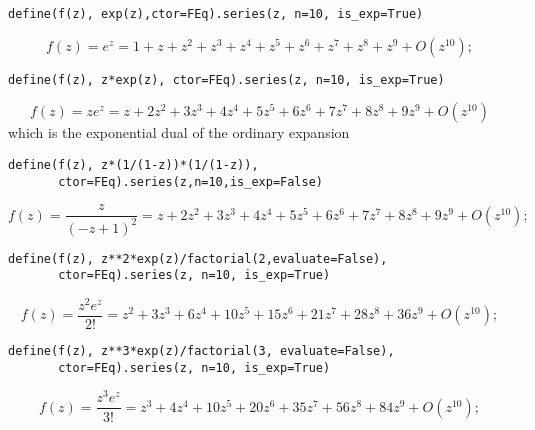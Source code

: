 \begin{verbatim}
define(f(z), exp(z),ctor=FEq).series(z, n=10, is_exp=True)
\end{verbatim}
\begin{displaymath}
f{\left (z \right )} = e^{z} = 1 + z + z^{2} + z^{3} + z^{4} + z^{5} + z^{6} + z^{7} + z^{8} + z^{9} + O\left(z^{10}\right);
\end{displaymath}

\begin{verbatim}
define(f(z), z*exp(z), ctor=FEq).series(z, n=10, is_exp=True)
\end{verbatim}
\begin{displaymath}
f{\left (z \right )} = z e^{z} = z + 2 z^{2} + 3 z^{3} + 4 z^{4} + 5 z^{5} + 6 z^{6} + 7 z^{7} + 8 z^{8} + 9 z^{9} + O\left(z^{10}\right)
\end{displaymath}
which is the exponential dual of the ordinary expansion
\begin{verbatim}
define(f(z), z*(1/(1-z))*(1/(1-z)),
       ctor=FEq).series(z,n=10,is_exp=False)
\end{verbatim}
\begin{displaymath}
f{\left (z \right )} = \frac{z}{\left(- z + 1\right)^{2}} = z + 2 z^{2} + 3 z^{3} + 4 z^{4} + 5 z^{5} + 6 z^{6} + 7 z^{7} + 8 z^{8} + 9 z^{9} + O\left(z^{10}\right);
\end{displaymath}

\begin{verbatim}
define(f(z), z**2*exp(z)/factorial(2,evaluate=False),
       ctor=FEq).series(z, n=10, is_exp=True)
\end{verbatim}
\begin{displaymath}
f{\left (z \right )} = \frac{z^{2} e^{z}}{2!} = z^{2} + 3 z^{3} + 6 z^{4} + 10 z^{5} + 15 z^{6} + 21 z^{7} + 28 z^{8} + 36 z^{9} + O\left(z^{10}\right);
\end{displaymath}

\begin{verbatim}
define(f(z), z**3*exp(z)/factorial(3, evaluate=False),
       ctor=FEq).series(z, n=10, is_exp=True)
\end{verbatim}
\begin{displaymath}
f{\left (z \right )} = \frac{z^{3} e^{z}}{3!} = z^{3} + 4 z^{4} + 10 z^{5} + 20 z^{6} + 35 z^{7} + 56 z^{8} + 84 z^{9} + O\left(z^{10}\right);
\end{displaymath}

